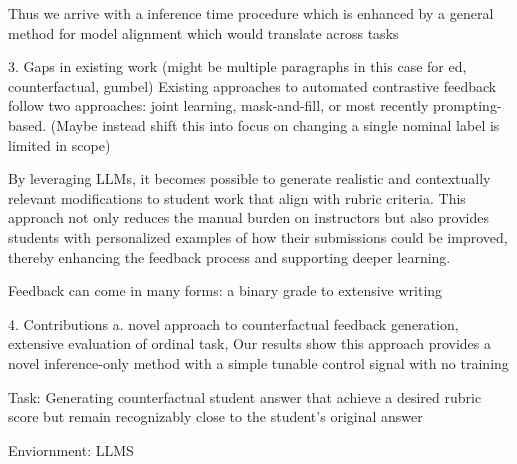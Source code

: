 Thus we arrive with a inference time procedure which is enhanced by a general method for model alignment which would translate across tasks

3. Gaps in existing work (might be multiple paragraphs in this case for ed, counterfactual, gumbel)
Existing approaches to automated contrastive feedback follow two approaches: joint learning, mask-and-fill, or most recently prompting-based. (Maybe instead shift this into focus on changing a single nominal label is limited in scope)

By leveraging LLMs, it becomes possible to generate realistic and contextually relevant modifications to student work that align with rubric criteria. This approach not only reduces the manual burden on instructors but also provides students with personalized examples of how their submissions could be improved, thereby enhancing the feedback process and supporting deeper learning.






Feedback can come in many forms: a binary grade to extensive writing




4. Contributions
a. novel approach to counterfactual feedback generation, extensive evaluation of ordinal task, Our results show this approach provides a novel inference-only method with a simple tunable control signal with no training

Task: Generating counterfactual student answer that achieve a desired rubric score but remain recognizably close to the student’s original answer

Enviornment: LLMS



